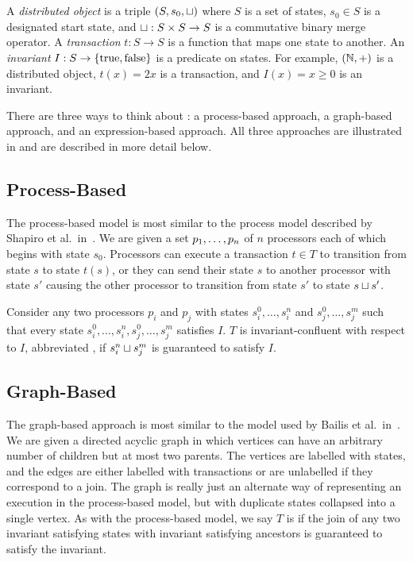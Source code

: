 \section{\Iconfluence{}}
A \emph{distributed object} is a triple $(S, s_0, \sqcup)$ where $S$ is a set of
states, $s_0 \in S$ is a designated start state, and $\sqcup: S \times S \to S$
is a commutative binary merge operator. A \emph{transaction} $t: S \to S$ is a
function that maps one state to another. An \emph{invariant} $I: S \to
\{\text{true}, \text{false}\}$ is a predicate on states. For example,
$(\mathbb{N}, +)$ is a distributed object, $t(x) = 2x$ is a transaction, and $I(x) =
x \geq 0$ is an invariant.

There are three ways to think about \Iconfluence{}: a process-based approach, a
graph-based approach, and an expression-based approach. All three approaches
are illustrated in  and are described in more
detail below.



\subsection{Process-Based}
The process-based model is most similar to the process model described by
Shapiro et al.\ in~\cite{shapiro2011conflict}. We are given a set
${p}_{1}, \ldots, {p}_{n}$ of $n$ processors each of which begins with state $s_0$.
Processors can execute a transaction $t \in T$ to transition from state $s$ to
state $t(s)$, or they can send their state $s$ to another processor with state
$s'$ causing the other processor to transition from state $s'$ to state $s
\sqcup s'$.

Consider any two processors $p_i$ and $p_j$ with states $s_i^0, \ldots, s_i^n$
and $s_j^0, \ldots, s_j^m$ such that every state $s_i^0, \ldots, s_i^n, s_j^0,
\ldots, s_j^m$ satisfies $I$. $T$ is invariant-confluent with respect to $I$,
abbreviated \Iconfluent{}, if $s_i^n \sqcup s_j^m$ is guaranteed to satisfy $I$.

\subsection{Graph-Based}
The graph-based approach is most similar to the model used by Bailis et al.\
in~\cite{bailis2014coordination}. We are given a directed acyclic graph in
which vertices can have an arbitrary number of children but at most two
parents. The vertices are labelled with states, and the edges are either
labelled with transactions or are unlabelled if they correspond to a join. The
graph is really just an alternate way of representing an execution in the
process-based model, but with duplicate states collapsed into a single vertex.
As with the process-based model, we say $T$ is \Iconfluent{} if the join of any
two invariant satisfying states with invariant satisfying ancestors is
guaranteed to satisfy the invariant.

